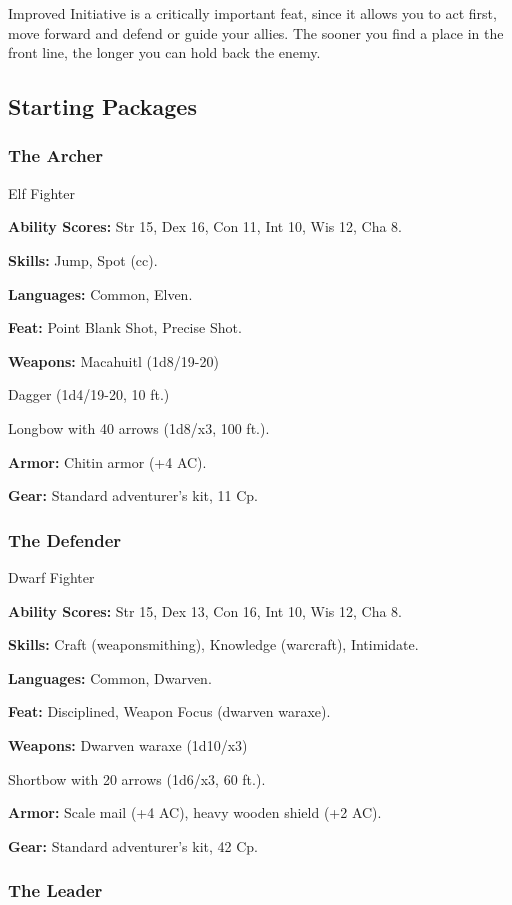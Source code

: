 Improved Initiative is a critically important feat, since it allows you to act first, move forward and defend or guide your allies. The sooner you find a place in the front line, the longer you can hold back the enemy.

\subsection{Starting Packages}

\subsubsection{The Archer}

Elf Fighter

\textbf{Ability Scores:} Str 15, Dex 16, Con 11, Int 10, Wis 12, Cha 8.

\textbf{Skills:} Jump, Spot (cc).

\textbf{Languages:} Common, Elven.

\textbf{Feat:} Point Blank Shot, Precise Shot.

\textbf{Weapons:} Macahuitl (1d8/19-20)

Dagger (1d4/19-20, 10 ft.)

Longbow with 40 arrows (1d8/x3, 100 ft.).

\textbf{Armor:} Chitin armor (+4 AC).

\textbf{Gear:} Standard adventurer’s kit, 11 Cp.

\subsubsection{The Defender}

Dwarf Fighter

\textbf{Ability Scores:} Str 15, Dex 13, Con 16, Int 10, Wis 12, Cha 8.

\textbf{Skills:} Craft (weaponsmithing), Knowledge (warcraft), Intimidate.

\textbf{Languages:} Common, Dwarven.

\textbf{Feat:} Disciplined, Weapon Focus (dwarven waraxe).

\textbf{Weapons:} Dwarven waraxe (1d10/x3)

Shortbow with 20 arrows (1d6/x3, 60 ft.).

\textbf{Armor:} Scale mail (+4 AC), heavy wooden shield (+2 AC).

\textbf{Gear:} Standard adventurer’s kit, 42 Cp.

\subsubsection{The Leader}

